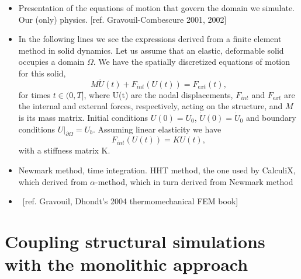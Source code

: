 \documentclass[a4paper, 11pt, oneside]{Thesis}  %
\begin{document}
        \begin{itemize}
            \item Presentation of the equations of motion that govern the domain we simulate.  Our (only) physics. [ref. Gravouil-Combescure 2001, 2002]
                \item In the following lines we see the expressions derived from a finite element method in solid dynamics. Let us assume that an elastic, deformable solid occupies a domain $\Omega$. We have the spatially discretized equations of motion for this solid,
                \begin{equation}
                    M\ddot{U}(t) + F_{int}(U(t)) = F_{ext}(t),
                    \label{eq:1}
                \end{equation}
                for times $t\in(0,T]$, where U(t) are the nodal displacements, $F_{int}$ and $F_{ext}$ are the internal and external forces, respectively, acting on the structure, and $M$ is its mass matrix. Initial conditions $U(0)=U_{0}$, $\dot{U}(0)=\dot{U}_{0}$ and boundary conditions $U\rvert_{\partial\Omega}=U_{b}$.
                Assuming linear elasticity we have
                \begin{equation}
                    F_{int}(U(t)) = KU(t),
                    \label{eq:2}
                \end{equation}
                with a stiffness matrix K.
            \item Newmark method, time integration. HHT method, the one used by CalculiX, which derived from $\alpha$-method, which in turn derived from Newmark method
            \item ~[ref. Gravouil, Dhondt's 2004 thermomechanical FEM book]
        \end{itemize}
    
    \section{Coupling structural simulations with the monolithic approach}
    
\end{document}
